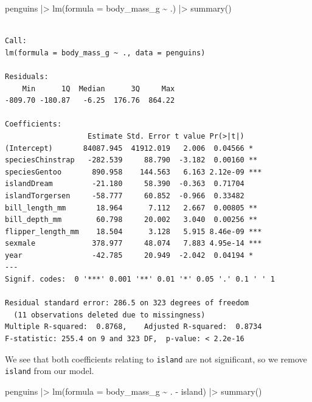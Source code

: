 \documentclass[
  letterpaper,
  DIV=11,
  numbers=noendperiod]{scrreprt}
\newenvironment{Shaded}{\begin{snugshade}}{\end{snugshade}}
\newcommand{\AttributeTok}[1]{\textcolor[rgb]{0.40,0.45,0.13}{#1}}
\newcommand{\FunctionTok}[1]{\textcolor[rgb]{0.28,0.35,0.67}{#1}}
\newcommand{\NormalTok}[1]{\textcolor[rgb]{0.00,0.23,0.31}{#1}}
\newcommand{\SpecialCharTok}[1]{\textcolor[rgb]{0.37,0.37,0.37}{#1}}
\begin{document}
\begin{Shaded}
\begin{Highlighting}[]
\NormalTok{penguins }\SpecialCharTok{|\textgreater{}} \FunctionTok{lm}\NormalTok{(}\AttributeTok{formula =}\NormalTok{ body\_mass\_g }\SpecialCharTok{\textasciitilde{}}\NormalTok{ .) }\SpecialCharTok{|\textgreater{}} \FunctionTok{summary}\NormalTok{()}
\end{Highlighting}
\end{Shaded}

\begin{verbatim}

Call:
lm(formula = body_mass_g ~ ., data = penguins)

Residuals:
    Min      1Q  Median      3Q     Max 
-809.70 -180.87   -6.25  176.76  864.22 

Coefficients:
                   Estimate Std. Error t value Pr(>|t|)    
(Intercept)       84087.945  41912.019   2.006  0.04566 *  
speciesChinstrap   -282.539     88.790  -3.182  0.00160 ** 
speciesGentoo       890.958    144.563   6.163 2.12e-09 ***
islandDream         -21.180     58.390  -0.363  0.71704    
islandTorgersen     -58.777     60.852  -0.966  0.33482    
bill_length_mm       18.964      7.112   2.667  0.00805 ** 
bill_depth_mm        60.798     20.002   3.040  0.00256 ** 
flipper_length_mm    18.504      3.128   5.915 8.46e-09 ***
sexmale             378.977     48.074   7.883 4.95e-14 ***
year                -42.785     20.949  -2.042  0.04194 *  
---
Signif. codes:  0 '***' 0.001 '**' 0.01 '*' 0.05 '.' 0.1 ' ' 1

Residual standard error: 286.5 on 323 degrees of freedom
  (11 observations deleted due to missingness)
Multiple R-squared:  0.8768,    Adjusted R-squared:  0.8734 
F-statistic: 255.4 on 9 and 323 DF,  p-value: < 2.2e-16
\end{verbatim}

We see that both coefficients relating to \texttt{island} are not
significant, so we remove \texttt{island} from our model.

\begin{Shaded}
\begin{Highlighting}[]
\NormalTok{penguins }\SpecialCharTok{|\textgreater{}} \FunctionTok{lm}\NormalTok{(}\AttributeTok{formula =}\NormalTok{ body\_mass\_g }\SpecialCharTok{\textasciitilde{}}\NormalTok{ . }\SpecialCharTok{{-}}\NormalTok{ island) }\SpecialCharTok{|\textgreater{}} \FunctionTok{summary}\NormalTok{() }
\end{Highlighting}
\end{Shaded}
\end{document}
